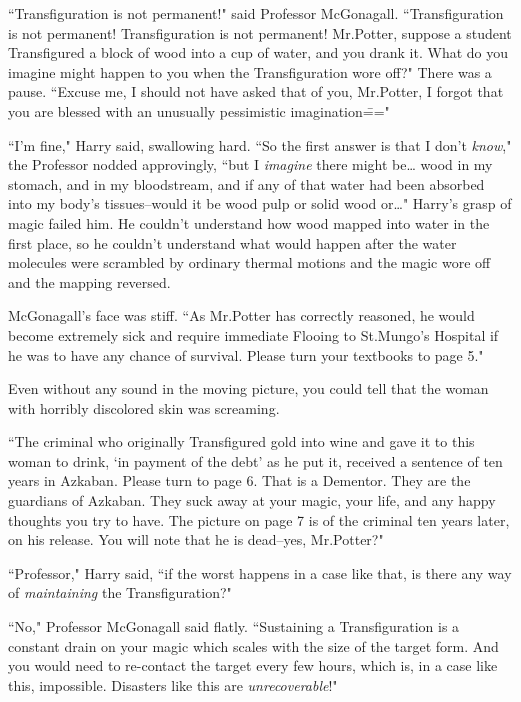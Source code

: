 
``Transfiguration is not permanent!" said Professor McGonagall. ``Transfiguration is not permanent! Transfiguration is not permanent! Mr.\?Potter, suppose a student Transfigured a block of wood into a cup of water, and you drank it. What do you imagine might happen to you when the Transfiguration wore off?" There was a pause. ``Excuse me, I should not have asked that of you, Mr.\?Potter, I forgot that you are blessed with an unusually pessimistic imagination\==="

``I'm fine," Harry said, swallowing hard. ``So the first answer is that I don't \emph{know}," the Professor nodded approvingly, ``but I \emph{imagine} there might be{\ldots} wood in my stomach, and in my bloodstream, and if any of that water had been absorbed into my body's tissues\---would it be wood pulp or solid wood or{\ldots}" Harry's grasp of magic failed him. He couldn't understand how wood mapped into water in the first place, so he couldn't understand what would happen after the water molecules were scrambled by ordinary thermal motions and the magic wore off and the mapping reversed.

McGonagall's face was stiff. ``As Mr.\?Potter has correctly reasoned, he would become extremely sick and require immediate Flooing to St.\?Mungo's Hospital if he was to have any chance of survival. Please turn your textbooks to page 5."

Even without any sound in the moving picture, you could tell that the woman with horribly discolored skin was screaming.

``The criminal who originally Transfigured gold into wine and gave it to this woman to drink, `in payment of the debt' as he put it, received a sentence of ten years in Azkaban. Please turn to page 6. That is a Dementor. They are the guardians of Azkaban. They suck away at your magic, your life, and any happy thoughts you try to have. The picture on page 7 is of the criminal ten years later, on his release. You will note that he is dead\---yes, Mr.\?Potter?"

``Professor," Harry said, ``if the worst happens in a case like that, is there any way of \emph{maintaining} the Transfiguration?"

``No," Professor McGonagall said flatly. ``Sustaining a Transfiguration is a constant drain on your magic which scales with the size of the target form. And you would need to re-contact the target every few hours, which is, in a case like this, impossible. Disasters like this are \emph{unrecoverable}!"

